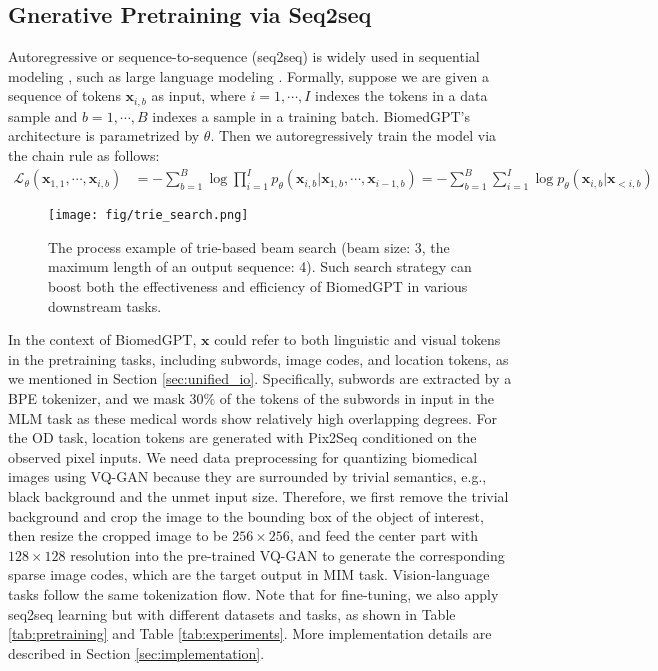 \documentclass[10pt]{article} \usepackage[preprint]{tmlr}
\begin{document}
\subsection{Gnerative Pretraining via Seq2seq} \label{sec:autoreg}
Autoregressive or sequence-to-sequence (seq2seq) is widely used in sequential modeling \citep{sutskever2014sequence, cho-etal-2014-learning, oord2016wavenet}, such as large language modeling \cite{lewis2019bart, raffel2020exploring}. Formally, suppose we are given a sequence of tokens $\mathbf{x}_{i,b}$ as input, where $i=1,\cdots, I$ indexes the tokens in a data sample and $b=1,\cdots, B$ indexes a sample in a training batch. BiomedGPT's architecture is parametrized by $\theta$. Then we autoregressively train the model via the chain rule as follows:
\begin{align}
    \mathcal{L}_\theta(\mathbf{x}_{1,1},\cdots,\mathbf{x}_{i,b}) &= -\sum_{b=1}^B\log\prod_{i=1}^{I}p_{\theta}(\mathbf{x}_{i,b}|\mathbf{x}_{1,b},\cdots,\mathbf{x}_{i-1,b})\nonumber =-\sum_{b=1}^B\sum_{i=1}^{I}\log p_{\theta}(\mathbf{x}_{i,b}|\mathbf{x}_{<i,b})
\end{align}

\begin{wrapfigure}{r}{0.5\textwidth}
  \begin{center}
    \texttt{[image: fig/trie\_search.png]}
  \end{center}
  \caption{The process example of trie-based beam search (beam size: 3, the maximum length of an output sequence: 4). Such search strategy can boost both the effectiveness and efficiency of BiomedGPT in various downstream tasks.} 
  \label{fig:trie}
\end{wrapfigure}
In the context of BiomedGPT, $\mathbf{x}$ could refer to both linguistic and visual tokens in the pretraining tasks, including subwords, image codes, and location tokens, as we mentioned in Section \ref{sec:unified_io}. Specifically, subwords are extracted by a BPE tokenizer, and we mask $30\%$ of the tokens of the subwords in input in the MLM task as these medical words show relatively high overlapping degrees. For the OD task, location tokens are generated with Pix2Seq \citep{chen2022pixseq} conditioned on the observed pixel inputs. We need data preprocessing for quantizing biomedical images using VQ-GAN \citep{esser2021taming} because they are surrounded by trivial semantics, e.g., black background and the unmet input size. Therefore, we first remove the trivial background and crop the image to the bounding box of the object of interest, then resize the cropped image to be $256 \times 256$, and feed the center part with $128 \times 128$ resolution into the pre-trained VQ-GAN to generate the corresponding sparse image codes, which are the target output in MIM task. Vision-language tasks follow the same tokenization flow. Note that for fine-tuning, we also apply seq2seq learning but with different datasets and tasks, as shown in Table \ref{tab:pretraining} and Table \ref{tab:experiments}. More implementation details are described in Section \ref{sec:implementation}. 
\end{document}
